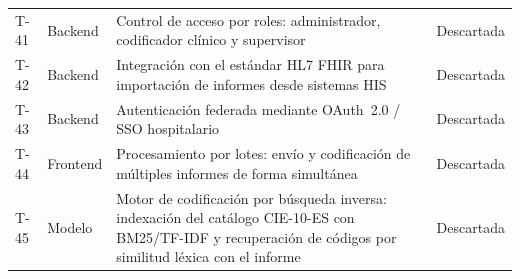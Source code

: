 \begin{center}
\begin{longtable}{llP{7.5cm}c}
T-41 & Backend & Control de acceso por roles: administrador, codificador clínico y supervisor & Descartada \\
T-42 & Backend & Integración con el estándar HL7 FHIR para importación de informes desde sistemas HIS & Descartada \\
T-43 & Backend & Autenticación federada mediante OAuth~2.0 / SSO hospitalario & Descartada \\
T-44 & Frontend & Procesamiento por lotes: envío y codificación de múltiples informes de forma simultánea & Descartada \\
T-45 & Modelo & Motor de codificación por búsqueda inversa: indexación del catálogo CIE-10-ES con BM25/TF-IDF y recuperación de códigos por similitud léxica con el informe & Descartada \\
\hline
\end{longtable}
\end{center}
